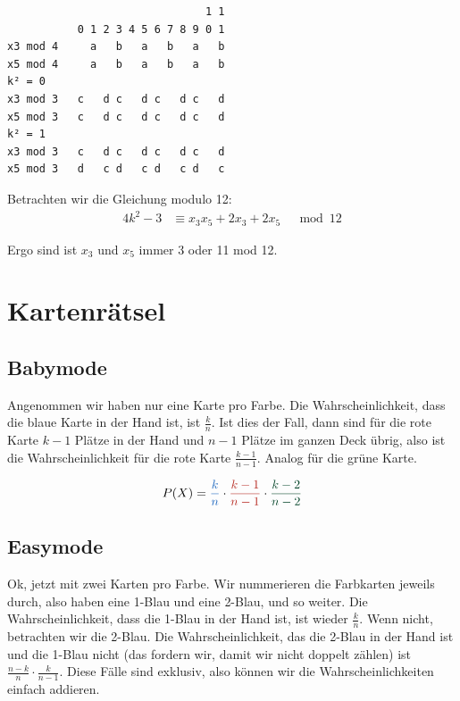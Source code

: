 \documentclass[../main.tex]{subfiles}
\begin{document}
\begin{verbatim}
                               1 1
           0 1 2 3 4 5 6 7 8 9 0 1
x3 mod 4     a   b   a   b   a   b
x5 mod 4     a   b   a   b   a   b
k² = 0
x3 mod 3   c   d c   d c   d c   d
x5 mod 3   c   d c   d c   d c   d
k² = 1
x3 mod 3   c   d c   d c   d c   d
x5 mod 3   d   c d   c d   c d   c
\end{verbatim}

Betrachten wir die Gleichung modulo 12:
\begin{align*}
    4k^2 - 3 &\equiv x_3x_5 + 2x_3 + 2x_5 &\mod 12
\end{align*}




Ergo sind ist $x_3$ und $x_5$ immer 3 oder 11 mod 12.
\fi

\iffalse
\chapter{Kartenrätsel}

\section{Babymode}

Angenommen wir haben nur eine Karte pro Farbe. Die Wahrscheinlichkeit, dass die blaue Karte in der Hand ist, ist $\frac{k}{n}$. Ist dies der Fall, dann sind für die rote Karte $k-1$ Plätze in der Hand und $n-1$ Plätze im ganzen Deck übrig, also ist die Wahrscheinlichkeit für die rote Karte $\frac{k-1}{n-1}$. Analog für die grüne Karte.

\begin{equation*}
    P(X) = \blue{\frac{k}{n}} \cdot \red{\frac{k-1}{n-1}} \cdot \green{\frac{k-2}{n-2}}
\end{equation*}

\section{Easymode}

Ok, jetzt mit zwei Karten pro Farbe. Wir nummerieren die Farbkarten jeweils durch, also haben eine 1-Blau und eine 2-Blau, und so weiter. Die Wahrscheinlichkeit, dass die 1-Blau in der Hand ist, ist wieder $\frac{k}{n}$. Wenn nicht, betrachten wir die 2-Blau. Die Wahrscheinlichkeit, das die 2-Blau in der Hand ist und die 1-Blau nicht (das fordern wir, damit wir nicht doppelt zählen) ist $\frac{n-k}{n}\cdot\frac{k}{n-1}$. Diese Fälle sind exklusiv, also können wir die Wahrscheinlichkeiten einfach addieren.
\end{document}
